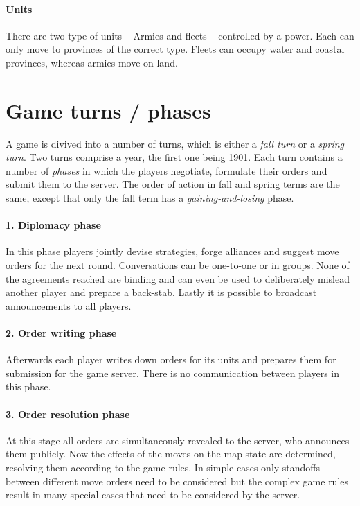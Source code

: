 \documentclass[pdftex,12pt,a4paper]{report}
\begin{document}
\paragraph{Units}

There are two type of units -- Armies and fleets -- controlled
by a power. Each can only move to provinces of the correct type.
Fleets can occupy water and coastal provinces, whereas armies 
move on land.

\section{Game turns / phases}

A game is divived into a number of turns, which is either a
\textit{fall turn} or a \textit{spring turn}. Two turns comprise
a year, the first one being 1901. Each turn contains a number of 
\textit{phases} in which the players negotiate, formulate
their orders and submit them to the server. The order of action in
fall and spring terms are the same, except that only the fall term
has a \textit{gaining-and-losing} phase.

\paragraph{1. Diplomacy phase}
In this phase players jointly devise strategies, forge alliances and
suggest move orders for the next round. Conversations can be 
one-to-one or in groups. None of the agreements
reached are binding and can even be used to deliberately 
mislead another player and prepare a back-stab. Lastly it is possible
to broadcast announcements to all players.

\paragraph{2. Order writing phase}
Afterwards each player writes down orders for its units and prepares
them for submission for the game server. There is no communication 
between players in this phase. 

\paragraph{3. Order resolution phase}
At this stage all orders are simultaneously revealed to the server,
who announces them publicly. Now the effects of the moves on the
map state are determined, resolving them according to the game rules.
In simple cases only standoffs between different move orders need
to be considered but the complex game rules result in many special
cases that need to be considered by the server. 
\end{document}
